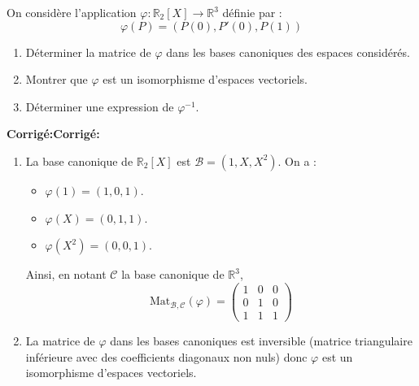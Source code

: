 \documentclass[a4paper,twoside,french,11pt]{VcCours}
\newcommand{\corr}{\textbf{Corrigé:}}
\begin{document}
\begin{Exercice}{} On considère l'application $\varphi : \mathbb{R}_2[X] \rightarrow \mathbb{R}^3$ définie par :
\[ \varphi(P)=(P(0),P'(0),P(1)) \]

\begin{enumerate}
\item Déterminer la matrice de $\varphi$ dans les bases canoniques des espaces considérés.
\item Montrer que $\varphi$ est un isomorphisme d'espaces vectoriels.
\item Déterminer une expression de $\varphi^{-1}$.
\end{enumerate}
\end{Exercice} 

\corr \corr \begin{enumerate}
\item La base canonique de $\mathbb{R}_2[X]$ est $\mathcal{B}=(1,X,X^2)$. On a :
\begin{itemize}
\item $\varphi(1) = (1,0,1)$.
\item $\varphi(X) = (0, 1, 1)$. 
\item $\varphi(X^2) = (0, 0, 1)$.
\end{itemize}
Ainsi, en notant $\mathcal{C}$ la base canonique de $\mathbb{R}^3$,
$$ \textrm{Mat}_{\mathcal{B}, \mathcal{C}}(\varphi) = \begin{pmatrix}
1 & 0 & 0 \\
0 & 1 & 0 \\
1 & 1 & 1 
\end{pmatrix}$$
\item La matrice de $\varphi$ dans les bases canoniques est inversible (matrice triangulaire inférieure avec des coefficients diagonaux non nuls) donc $\varphi$ est un isomorphisme d'espaces vectoriels. 


\end{enumerate}
\end{document}
